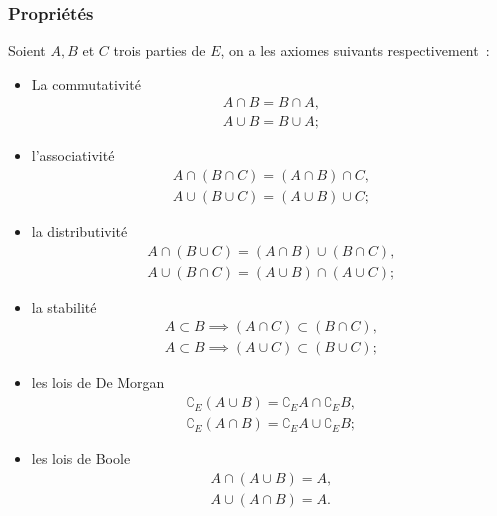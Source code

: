 \subsubsection{Propriétés}
\label{chap3-subsubsec:prop}
\begin{axiome}
    Soient \(A, B\) et \(C\) trois parties de \(E\), on a les axiomes suivants 
    respectivement~:
    \begin{itemize}
        \item La commutativité
            \begin{gather}
                A \cap B= B \cap A, \\
                A \cup B=B \cup A;
            \end{gather}
        \item l'associativité
            \begin{gather}
                A \cap (B \cap C)=(A \cap B) \cap C, \\ 
                A \cup (B \cup C)=(A \cup B) \cup C;
            \end{gather}
        \item la distributivité
            \begin{gather}
                A \cap (B \cup C)=(A \cap B) \cup (B \cap C), \\ 
                A \cup (B \cap C)=(A \cup B) \cap (A \cup C);
            \end{gather}
        \item la stabilité
            \begin{gather}
                A \subset B \implies (A \cap C) \subset (B \cap C), \\ 
                A \subset B \implies (A \cup C) \subset (B \cup C);
            \end{gather}
        \item les lois de De Morgan
            \begin{gather}
                \complement_E (A \cup B)=\complement_E A \cap \complement_E B, \\ 
                \complement_E (A \cap B)=\complement_E A \cup \complement_E B;
            \end{gather}
        \item les lois de Boole
            \begin{gather}
                A \cap (A \cup B)=A, \\ 
                A \cup (A \cap B)=A.
            \end{gather}
    \end{itemize}
\end{axiome}
